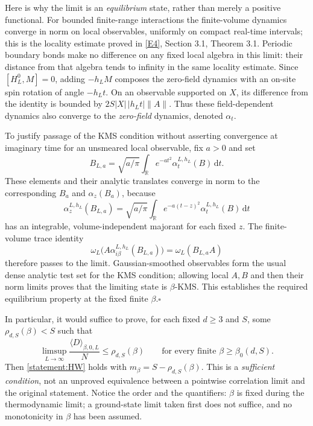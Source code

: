 \documentclass[11pt]{article}
\newcommand{\R}{\mathbb{R}}
\newcommand{\dd}{\,\mathrm d}
\newcommand{\eref}[2]{\hyperlink{extra:#1:#2}{[E#2]}}
\begin{document}
	Here is why the limit is an \emph{equilibrium} state, rather than merely
	a positive functional. For bounded finite-range interactions the
	finite-volume dynamics converge in norm on local observables, uniformly
	on compact real-time intervals; this is the locality estimate proved in
	\eref{statement}{4}, Section 3.1, Theorem 3.1. Periodic boundary bonds make no
	difference on any fixed local algebra in this limit: their distance
	from that algebra tends to infinity in the same locality estimate.
	Since $[H_L^0,M]=0$, adding $-h_LM$ composes the zero-field dynamics
	with an on-site spin rotation of angle $-h_Lt$. On an observable
	supported on $X$, its difference from the identity is bounded by
	$2S|X|\,|h_Lt|\|A\|$. Thus these field-dependent dynamics also converge
	to the \emph{zero-field} dynamics, denoted $\alpha_t$.
	
	To justify passage of the KMS condition without asserting convergence
	at imaginary time for an unsmeared local observable, fix $a>0$ and set
	\[
	B_{L,a}=\sqrt{a/\pi}\int_{\R} e^{-at^2}\alpha_t^{L,h_L}(B)\dd t.
	\]
	These elements and their analytic translates converge in norm to the
	corresponding $B_a$ and $\alpha_z(B_a)$, because
	\[
	\alpha_z^{L,h_L}(B_{L,a})
	=\sqrt{a/\pi}\int_{\R} e^{-a(t-z)^2}\alpha_t^{L,h_L}(B)\dd t
	\]
	has an integrable, volume-independent majorant for each fixed $z$.
	The finite-volume trace identity
	\[
	\omega_L\bigl(A\alpha_{i\beta}^{L,h_L}(B_{L,a})\bigr)
	=\omega_L(B_{L,a}A)
	\]
	therefore passes to the limit. Gaussian-smoothed observables form the
	usual dense analytic test set for the KMS condition; allowing local
	$A,B$ and then their norm limits proves that the limiting state is
	$\beta$-KMS. This establishes the required equilibrium property at the
	fixed finite $\beta$.\hfill$\square$
	
	In particular, it would suffice to prove, for each fixed $d\geq3$ and
	$S$, some $\rho_{d,S}(\beta)<S$ such that
	\begin{equation}\label{statement:defectgoal}
		\limsup_{L\to\infty}\frac{\langle D\rangle_{\beta,0,L}}{N}
		\leq\rho_{d,S}(\beta)
		\qquad\text{for every finite }\beta\geq\beta_0(d,S).
	\end{equation}
	Then \eqref{statement:HW} holds with $m_\beta=S-\rho_{d,S}(\beta)$.
	This is a \emph{sufficient condition}, not an unproved equivalence
	between a pointwise correlation limit and the original statement.
	Notice the order and the quantifiers: $\beta$ is fixed during the
	thermodynamic limit; a ground-state limit taken first does not suffice,
	and no monotonicity in $\beta$ has been assumed.
	
\end{document}
